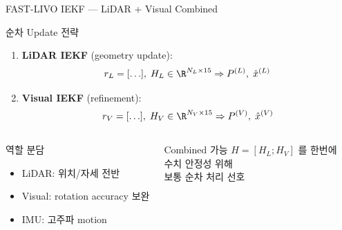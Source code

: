 \begin{frame}{FAST-LIVO IEKF — LiDAR + Visual Combined}
  \begin{block}{순차 Update 전략}
    \begin{enumerate}
      \item \textbf{LiDAR IEKF} (geometry update):
        \begin{align*}
          r_L = [\ldots],\; H_L \in \R^{N_L \times 15}
          \Rightarrow P^{(L)},\; \hat{x}^{(L)}
        \end{align*}
      \item \textbf{Visual IEKF} (refinement):
        \begin{align*}
          r_V = [\ldots],\; H_V \in \R^{N_V \times 15}
          \Rightarrow P^{(V)},\; \hat{x}^{(V)}
        \end{align*}
    \end{enumerate}
  \end{block}
  \pause
  \begin{columns}
    \begin{alertblock}{역할 분담}
      \begin{itemize}
        \item LiDAR: 위치/자세 전반
        \item Visual: rotation accuracy 보완
        \item IMU: 고주파 motion
      \end{itemize}
    \end{alertblock}
    \begin{exampleblock}{Combined 가능}
      $H = [H_L; H_V]$ 를 한번에\\
      수치 안정성 위해\\
      보통 순차 처리 선호
    \end{exampleblock}
  \end{columns}
\end{frame}

